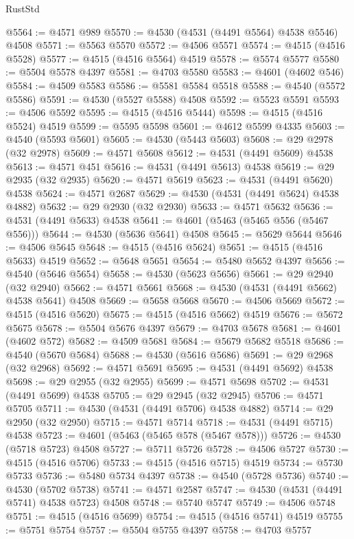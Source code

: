 \begin{lexlean}{RustStd}
\begin{coremodule}
{\begin{coremodule}
{{{{{{{{{{{{{{{{{{{{{{{{{{{{{{{{{{{{{{{{{{{{{{{{{{{{{{{@5564 := @4571 @989
@5570 := @4530 (@4531 (@4491 @5564) @4538 @5546) @4508
@5571 := @5563 @5570
@5572 := @4506 @5571
@5574 := @4515 (@4516 @5528)
@5577 := @4515 (@4516 @5564) @4519
@5578 := @5574 @5577
@5580 := @5504 @5578 @4397
@5581 := @4703 @5580
@5583 := @4601 (@4602 @546)
@5584 := @4509 @5583
@5586 := @5581 @5584 @5518
@5588 := @4540 (@5572 @5586)
@5591 := @4530 (@5527 @5588) @4508
@5592 := @5523 @5591
@5593 := @4506 @5592
@5595 := @4515 (@4516 @5444)
@5598 := @4515 (@4516 @5524) @4519
@5599 := @5595 @5598
@5601 := @4612 @5599 @4335
@5603 := @4540 (@5593 @5601)
@5605 := @4530 (@5443 @5603)
@5608 := @29 @2978 (@32 @2978)
@5609 := @4571 @5608
@5612 := @4531 (@4491 @5609) @4538
@5613 := @4571 @451
@5616 := @4531 (@4491 @5613) @4538
@5619 := @29 @2935 (@32 @2935)
@5620 := @4571 @5619
@5623 := @4531 (@4491 @5620) @4538
@5624 := @4571 @2687
@5629 := @4530 (@4531 (@4491 @5624) @4538 @4882)
@5632 := @29 @2930 (@32 @2930)
@5633 := @4571 @5632
@5636 := @4531 (@4491 @5633) @4538
@5641 := @4601 (@5463 (@5465 @556 (@5467 @556)))
@5644 := @4530 (@5636 @5641) @4508
@5645 := @5629 @5644
@5646 := @4506 @5645
@5648 := @4515 (@4516 @5624)
@5651 := @4515 (@4516 @5633) @4519
@5652 := @5648 @5651
@5654 := @5480 @5652 @4397
@5656 := @4540 (@5646 @5654)
@5658 := @4530 (@5623 @5656)
@5661 := @29 @2940 (@32 @2940)
@5662 := @4571 @5661
@5668 := @4530 (@4531 (@4491 @5662) @4538 @5641) @4508
@5669 := @5658 @5668
@5670 := @4506 @5669
@5672 := @4515 (@4516 @5620)
@5675 := @4515 (@4516 @5662) @4519
@5676 := @5672 @5675
@5678 := @5504 @5676 @4397
@5679 := @4703 @5678
@5681 := @4601 (@4602 @572)
@5682 := @4509 @5681
@5684 := @5679 @5682 @5518
@5686 := @4540 (@5670 @5684)
@5688 := @4530 (@5616 @5686)
@5691 := @29 @2968 (@32 @2968)
@5692 := @4571 @5691
@5695 := @4531 (@4491 @5692) @4538
@5698 := @29 @2955 (@32 @2955)
@5699 := @4571 @5698
@5702 := @4531 (@4491 @5699) @4538
@5705 := @29 @2945 (@32 @2945)
@5706 := @4571 @5705
@5711 := @4530 (@4531 (@4491 @5706) @4538 @4882)
@5714 := @29 @2950 (@32 @2950)
@5715 := @4571 @5714
@5718 := @4531 (@4491 @5715) @4538
@5723 := @4601 (@5463 (@5465 @578 (@5467 @578)))
@5726 := @4530 (@5718 @5723) @4508
@5727 := @5711 @5726
@5728 := @4506 @5727
@5730 := @4515 (@4516 @5706)
@5733 := @4515 (@4516 @5715) @4519
@5734 := @5730 @5733
@5736 := @5480 @5734 @4397
@5738 := @4540 (@5728 @5736)
@5740 := @4530 (@5702 @5738)
@5741 := @4571 @2587
@5747 := @4530 (@4531 (@4491 @5741) @4538 @5723) @4508
@5748 := @5740 @5747
@5749 := @4506 @5748
@5751 := @4515 (@4516 @5699)
@5754 := @4515 (@4516 @5741) @4519
@5755 := @5751 @5754
@5757 := @5504 @5755 @4397
@5758 := @4703 @5757
}}}}}}}}}}}}}}}}}}}}}}}}}}}}}}}}}}}}}}}}}}}}}}}}}}}}}}}
\end{coremodule}}
\end{coremodule}
\end{lexlean}
